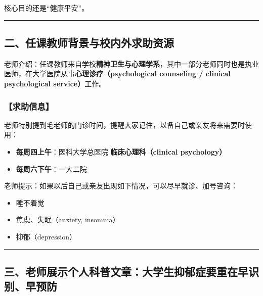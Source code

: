 \documentclass[
  chinese,
  9pt,
  a4paper,
]{ctexart}
\providecommand{\tightlist}{%
  \setlength{\itemsep}{0pt}\setlength{\parskip}{0pt}}
\begin{document}
核心目的还是``健康平安''。

\begin{center}\rule{0.5\linewidth}{0.5pt}\end{center}

\subsection{二、任课教师背景与校内外求助资源}\label{ux4e8cux4efbux8bfeux6559ux5e08ux80ccux666fux4e0eux6821ux5185ux5916ux6c42ux52a9ux8d44ux6e90}

老师介绍：任课教师来自学校\textbf{精神卫生与心理学系}，其中一部分老师同时也是执业医师，在大学医院从事\textbf{心理诊疗（psychological
counseling / clinical psychological service）}工作。

\subsubsection{【求助信息】}\label{ux6c42ux52a9ux4fe1ux606f}

老师特别提到毛老师的门诊时间，提醒大家记住，以备自己或亲友将来需要时使用：

\begin{itemize}
\tightlist
\item
  \textbf{每周四上午}：医科大学总医院 \textbf{临床心理科（clinical
  psychology）}
\item
  \textbf{每周六下午}：一大二院
\end{itemize}

老师提示：如果以后自己或亲友出现如下情况，可以尽早就诊、加号咨询：

\begin{itemize}
\tightlist
\item
  睡不着觉
\item
  焦虑、失眠（anxiety, insomnia）
\item
  抑郁（depression）
\end{itemize}

\begin{center}\rule{0.5\linewidth}{0.5pt}\end{center}

\subsection{三、老师展示个人科普文章：大学生抑郁症要重在早识别、早预防}\label{ux4e09ux8001ux5e08ux5c55ux793aux4e2aux4ebaux79d1ux666eux6587ux7ae0ux5927ux5b66ux751fux6291ux90c1ux75c7ux8981ux91cdux5728ux65e9ux8bc6ux522bux65e9ux9884ux9632}
\end{document}

